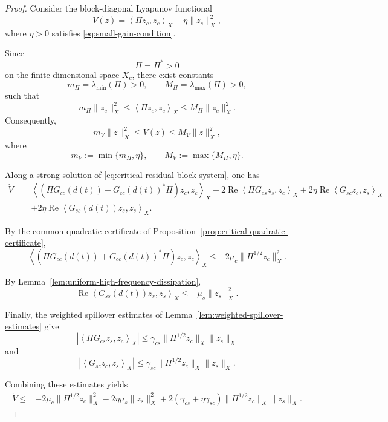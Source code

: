 \documentclass[10pt,a4paper]{amsart}
\begin{document}
\begin{proof}

Consider the block-diagonal Lyapunov functional
\begin{equation}
V(z)
=
\left\langle
\Pi z_c,
z_c
\right\rangle_X
+
\eta\|z_s\|_X^2,
\label{eq:coupled-Lyapunov}
\end{equation}
where \(\eta>0\) satisfies
\eqref{eq:small-gain-condition}.

Since
\[
\Pi=\Pi^*>0
\]
on the finite-dimensional space \(X_c\), there exist constants
\[
m_\Pi
=
\lambda_{\min}(\Pi)>0,
\qquad
M_\Pi
=
\lambda_{\max}(\Pi)>0,
\]
such that
\[
m_\Pi\|z_c\|_X^2
\le
\left\langle
\Pi z_c,
z_c
\right\rangle_X
\le
M_\Pi\|z_c\|_X^2.
\]
Consequently,
\begin{equation}
m_V\|z\|_X^2
\le
V(z)
\le
M_V\|z\|_X^2,
\label{eq:Lyapunov-equivalence}
\end{equation}
where
\[
m_V:=\min\{m_\Pi,\eta\},
\qquad
M_V:=\max\{M_\Pi,\eta\}.
\]

Along a strong solution of
\eqref{eq:critical-residual-block-system}, one has
\[
\begin{aligned}
\dot V
={}&
\left\langle
\left(
\Pi G_{cc}(d(t))
+
G_{cc}(d(t))^*\Pi
\right)z_c,
z_c
\right\rangle_X
+
2\operatorname{Re}
\left\langle
\Pi G_{cs}z_s,
z_c
\right\rangle_X
+
2\eta\operatorname{Re}
\left\langle
G_{sc}z_c,
z_s
\right\rangle_X
\\
&+
2\eta\operatorname{Re}
\left\langle
G_{ss}(d(t))z_s,
z_s
\right\rangle_X .
\end{aligned}
\]

By the common quadratic certificate of Proposition~\ref{prop:critical-quadratic-certificate},
\[
\left\langle
\left(
\Pi G_{cc}(d(t))
+
G_{cc}(d(t))^*\Pi
\right)z_c,
z_c
\right\rangle_X
\le
-2\mu_c
\|\Pi^{1/2}z_c\|_X^2.
\]

By Lemma~\ref{lem:uniform-high-frequency-dissipation},
\[
\operatorname{Re}
\left\langle
G_{ss}(d(t))z_s,
z_s
\right\rangle_X
\le
-\mu_s\|z_s\|_X^2.
\]

Finally, the weighted spillover estimates of Lemma~\ref{lem:weighted-spillover-estimates}
give
\[
\left|
\left\langle
\Pi G_{cs}z_s,
z_c
\right\rangle_X
\right|
\le
\gamma_{cs}
\|\Pi^{1/2}z_c\|_X
\|z_s\|_X
\]
and
\[
\left|
\left\langle
G_{sc}z_c,
z_s
\right\rangle_X
\right|
\le
\gamma_{sc}
\|\Pi^{1/2}z_c\|_X
\|z_s\|_X.
\]

Combining these estimates yields
\begin{equation}
\begin{aligned}
\dot V
\le{}&
-2\mu_c
\|\Pi^{1/2}z_c\|_X^2
-
2\eta\mu_s
\|z_s\|_X^2
+
2\left(
\gamma_{cs}
+
\eta\gamma_{sc}
\right)
\|\Pi^{1/2}z_c\|_X
\|z_s\|_X.
\end{aligned}
\label{eq:coupled-Lyapunov-derivative}
\end{equation}


\end{proof}
\end{document}
